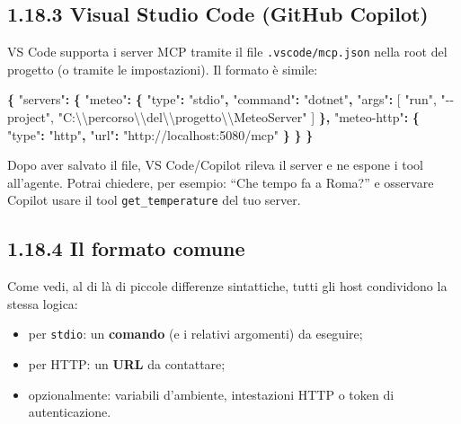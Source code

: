 \documentclass[
  italian,
  10pt,
]{book}
\newenvironment{Shaded}{\begin{snugshade}}{\end{snugshade}}
\newcommand{\CharTok}[1]{\textcolor[rgb]{0.31,0.60,0.02}{#1}}
\newcommand{\DataTypeTok}[1]{\textcolor[rgb]{0.13,0.29,0.53}{#1}}
\newcommand{\FunctionTok}[1]{\textcolor[rgb]{0.13,0.29,0.53}{\textbf{#1}}}
\newcommand{\OtherTok}[1]{\textcolor[rgb]{0.56,0.35,0.01}{#1}}
\newcommand{\StringTok}[1]{\textcolor[rgb]{0.31,0.60,0.02}{#1}}
\providecommand{\tightlist}{%
  \setlength{\itemsep}{0pt}\setlength{\parskip}{0pt}}
\begin{document}
\subsection{1.18.3 Visual Studio Code (GitHub
Copilot)}\label{visual-studio-code-github-copilot}

VS Code supporta i server MCP tramite il file \texttt{.vscode/mcp.json}
nella root del progetto (o tramite le impostazioni). Il formato è
simile:

\begin{Shaded}
\begin{Highlighting}[]
\FunctionTok{\{}
  \DataTypeTok{"servers"}\FunctionTok{:} \FunctionTok{\{}
    \DataTypeTok{"meteo"}\FunctionTok{:} \FunctionTok{\{}
      \DataTypeTok{"type"}\FunctionTok{:} \StringTok{"stdio"}\FunctionTok{,}
      \DataTypeTok{"command"}\FunctionTok{:} \StringTok{"dotnet"}\FunctionTok{,}
      \DataTypeTok{"args"}\FunctionTok{:} \OtherTok{[}
        \StringTok{"run"}\OtherTok{,}
        \StringTok{"{-}{-}project"}\OtherTok{,}
        \StringTok{"C:}\CharTok{\textbackslash{}\textbackslash{}}\StringTok{percorso}\CharTok{\textbackslash{}\textbackslash{}}\StringTok{del}\CharTok{\textbackslash{}\textbackslash{}}\StringTok{progetto}\CharTok{\textbackslash{}\textbackslash{}}\StringTok{MeteoServer"}
      \OtherTok{]}
    \FunctionTok{\},}
    \DataTypeTok{"meteo{-}http"}\FunctionTok{:} \FunctionTok{\{}
      \DataTypeTok{"type"}\FunctionTok{:} \StringTok{"http"}\FunctionTok{,}
      \DataTypeTok{"url"}\FunctionTok{:} \StringTok{"http://localhost:5080/mcp"}
    \FunctionTok{\}}
  \FunctionTok{\}}
\FunctionTok{\}}
\end{Highlighting}
\end{Shaded}

Dopo aver salvato il file, VS Code/Copilot rileva il server e ne espone
i tool all'agente. Potrai chiedere, per esempio: ``Che tempo fa a
Roma?'' e osservare Copilot usare il tool \texttt{get\_temperature} del
tuo server.

\subsection{1.18.4 Il formato comune}\label{il-formato-comune}

Come vedi, al di là di piccole differenze sintattiche, tutti gli host
condividono la stessa logica:

\begin{itemize}
\tightlist
\item
  per \texttt{stdio}: un \textbf{comando} (e i relativi argomenti) da
  eseguire;
\item
  per HTTP: un \textbf{URL} da contattare;
\item
  opzionalmente: variabili d'ambiente, intestazioni HTTP o token di
  autenticazione.
\end{itemize}
\end{document}
